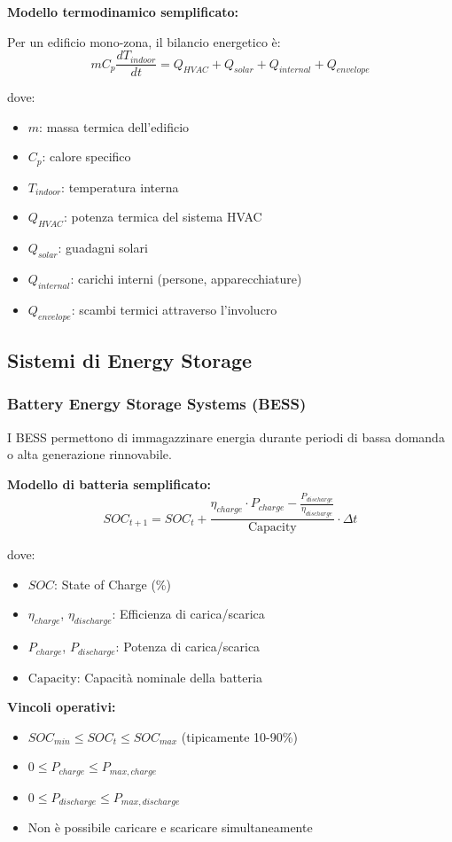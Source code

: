 \documentclass[12pt,a4paper,twoside]{report}
\begin{document}
\textbf{Modello termodinamico semplificato:}

Per un edificio mono-zona, il bilancio energetico è:
$$mC_p \frac{dT_{indoor}}{dt} = Q_{HVAC} + Q_{solar} + Q_{internal} + Q_{envelope}$$

dove:
\begin{itemize}
    \item $m$: massa termica dell'edificio
    \item $C_p$: calore specifico
    \item $T_{indoor}$: temperatura interna
    \item $Q_{HVAC}$: potenza termica del sistema HVAC
    \item $Q_{solar}$: guadagni solari
    \item $Q_{internal}$: carichi interni (persone, apparecchiature)
    \item $Q_{envelope}$: scambi termici attraverso l'involucro
\end{itemize}

\subsection{Sistemi di Energy Storage}

\subsubsection{Battery Energy Storage Systems (BESS)}

I BESS permettono di immagazzinare energia durante periodi di bassa domanda o alta generazione rinnovabile.

\textbf{Modello di batteria semplificato:}
$$SOC_{t+1} = SOC_t + \frac{\eta_{charge} \cdot P_{charge} - \frac{P_{discharge}}{\eta_{discharge}}}{\text{Capacity}} \cdot \Delta t$$

dove:
\begin{itemize}
    \item $SOC$: State of Charge (\%)
    \item $\eta_{charge}$, $\eta_{discharge}$: Efficienza di carica/scarica
    \item $P_{charge}$, $P_{discharge}$: Potenza di carica/scarica
    \item $\text{Capacity}$: Capacità nominale della batteria
\end{itemize}

\textbf{Vincoli operativi:}
\begin{itemize}
    \item $SOC_{min} \leq SOC_t \leq SOC_{max}$ (tipicamente 10-90\%)
    \item $0 \leq P_{charge} \leq P_{max,charge}$
    \item $0 \leq P_{discharge} \leq P_{max,discharge}$
    \item Non è possibile caricare e scaricare simultaneamente
\end{itemize}
\end{document}
